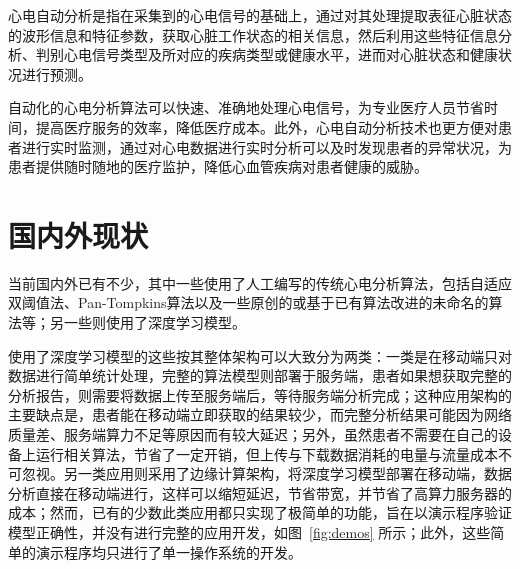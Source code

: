 心电自动分析是指在采集到的心电信号的基础上，通过对其处理提取表征心脏状态的波形信息和特征参数，获取心脏工作状态的相关信息，然后利用这些特征信息分析、判别心电信号类型及所对应的疾病类型或健康水平，进而对心脏状态和健康状况进行预测\cite{jiXindianxinhaozidongfenxiguanjianjishuyanjiu2006}。

自动化的心电分析算法可以快速、准确地处理心电信号，为专业医疗人员节省时间，提高医疗服务的效率，降低医疗成本。此外，心电自动分析技术也更方便对患者进行实时监测，通过对心电数据进行实时分析可以及时发现患者的异常状况，为患者提供随时随地的医疗监护，降低心血管疾病对患者健康的威胁。


\section{国内外\app 现状}\label{sec:status}

当前国内外已有不少\app ，其中一些使用了人工编写的传统心电分析算法\cite{zhengJiyukechuandaishebeideyidongjianhuAPP2019,wuYidongxindianjiancexitongdeyanjiuyushixian2018,chenYidongxindianxinxijianhuxitongjixindianjiancesuanfadeyanjiu2018,heJiyuyidongpingtaidexindianjianceyiliaoxitongdeshixian2017,gradlRealtimeECGMonitoring2012,wenRealtimeECGTelemonitoring2008}，包括自适应双阈值法\cite{chenYidongxindianxinxijianhuxitongjixindianjiancesuanfadeyanjiu2018}、Pan-Tompkins算法\cite{gradlRealtimeECGMonitoring2012}以及一些原创的或基于已有算法改进的未命名的算法等；另一些\app 则使用了深度学习模型\cite{wangJiyushenduxuexideyidongyuanchengxindianjiancexitongshejiyushixian2020,singhSmartECGMonitoring2022,chenJiyushenduxuexidexindianfenximoxingdeshejiyuyouhua2021,liuJiyuyidongzhongduanfenxidekechuandairouxingxindianjiancexitong2021,wangEnablingSmartPersonalized2014,jinPredictingCardiovascularDisease2009}。

使用了深度学习模型的这些\app 按其整体架构可以大致分为两类：一类是在移动端只对数据进行简单统计处理，完整的算法模型则部署于服务端\cite{wangJiyushenduxuexideyidongyuanchengxindianjiancexitongshejiyushixian2020,singhSmartECGMonitoring2022}，患者如果想获取完整的分析报告，则需要将数据上传至服务端后，等待服务端分析完成；这种应用架构的主要缺点是，患者能在移动端立即获取的结果较少，而完整分析结果可能因为网络质量差、服务端算力不足等原因而有较大延迟；另外，虽然患者不需要在自己的设备上运行相关算法，节省了一定开销，但上传与下载数据消耗的电量与流量成本不可忽视。另一类应用则采用了边缘计算架构，将深度学习模型部署在移动端，数据分析直接在移动端进行\cite{chenJiyushenduxuexidexindianfenximoxingdeshejiyuyouhua2021,liuJiyuyidongzhongduanfenxidekechuandairouxingxindianjiancexitong2021,wangEnablingSmartPersonalized2014,jinPredictingCardiovascularDisease2009}，这样可以缩短延迟，节省带宽，并节省了高算力服务器的成本；然而，已有的少数此类应用都只实现了极简单的功能，旨在以演示程序验证模型正确性，并没有进行完整的应用开发，如图~\ref{fig:demos} 所示；此外，这些简单的演示程序均只进行了单一操作系统的开发。

